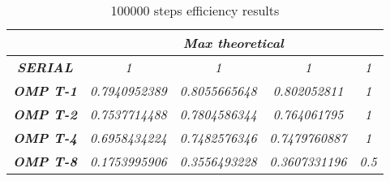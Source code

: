 \begin{table}
    \centering
    \begin{tabular}{|c|c|c|c|c|} 
    \hline
                                                    & \multicolumn{4}{c|}{\textbf{\textit{Max theoretical}}}                                                                                                                    \\ 
    \hline
    \textbf{\textit{SERIAL}}                        & \textit{1}                                 & \textit{1}                                 & \textit{1}                                 & \textit{1}                         \\ 
    \hline
    \textbf{\textit{OMP T-1}}                       & \textit{0.7940952389}                      & \textit{0.8055665648}                      & \textit{0.802052811}                       & \textit{1}                         \\ 
    \hline
    \textbf{\textit{OMP T-2}}                       & \textit{0.7537714488}                      & \textit{0.7804586344}                      & \textit{0.764061795}                       & \textit{1}                         \\ 
    \hline
    \textbf{\textit{OMP T-4}}                       & \textit{0.6958434224}                      & \textit{0.7482576346}                      & \textit{0.7479760887}                      & \textit{1}                         \\ 
    \hline
    \multicolumn{1}{|l|}{\textbf{\textit{OMP T-8}}} & \multicolumn{1}{l|}{\textit{0.1753995906}} & \multicolumn{1}{l|}{\textit{0.3556493228}} & \multicolumn{1}{l|}{\textit{0.3607331196}} & \multicolumn{1}{l|}{\textit{0.5}}  \\
    \hline
    \end{tabular}
    \caption{100000 steps efficiency results}
    \end{table}